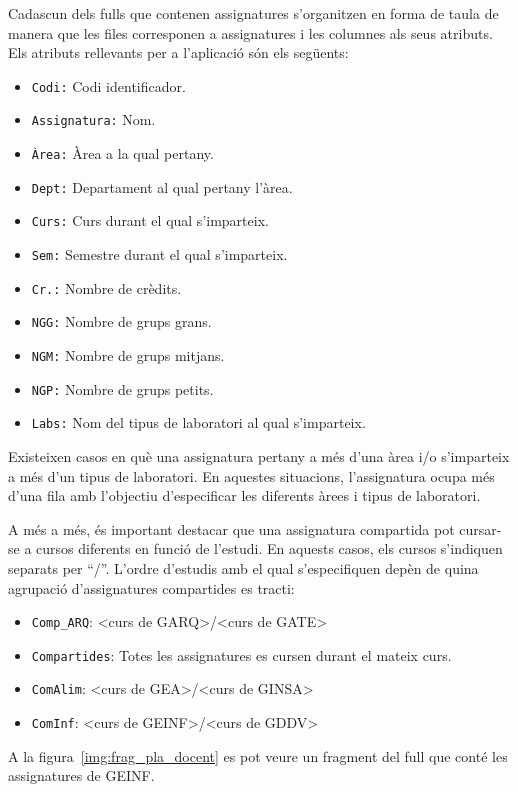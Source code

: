 \documentclass[a4paper,12pt]{ThesisStyle}
\begin{document}
Cadascun dels fulls que contenen assignatures s'organitzen en forma de taula de manera que les files corresponen a assignatures i les columnes als seus atributs. Els atributs rellevants per a l'aplicació són els següents:
\begin{itemize}
  \item \texttt{Codi:} Codi identificador.
  \item \texttt{Assignatura:} Nom.
  \item \texttt{Àrea:} Àrea a la qual pertany.
  \item \texttt{Dept:} Departament al qual pertany l'àrea.
  \item \texttt{Curs:} Curs durant el qual s'imparteix.
  \item \texttt{Sem:} Semestre durant el qual s'imparteix.
  \item \texttt{Cr.:} Nombre de crèdits.
  \item \texttt{NGG:} Nombre de grups grans.
  \item \texttt{NGM:} Nombre de grups mitjans.
  \item \texttt{NGP:} Nombre de grups petits.
  \item \texttt{Labs:} Nom del tipus de laboratori al qual s'imparteix.
\end{itemize}

Existeixen casos en què una assignatura pertany a més d'una àrea i/o s'imparteix a més d'un tipus de laboratori. En aquestes situacions, l'assignatura ocupa més d'una fila amb l'objectiu d'especificar les diferents àrees i tipus de laboratori.

A més a més, és important destacar que una assignatura compartida pot cursar-se a cursos diferents en funció de l'estudi. En aquests casos, els cursos s'indiquen separats per ``/''. L'ordre d'estudis amb el qual s'especifiquen depèn de quina agrupació d'assignatures compartides es tracti:
\begin{itemize}
  \item \texttt{Comp\_ARQ}: <curs de GARQ>/<curs de GATE>
  \item \texttt{Compartides}: Totes les assignatures es cursen durant el mateix curs.
  \item \texttt{ComAlim}: <curs de GEA>/<curs de GINSA>
  \item \texttt{ComInf}: <curs de GEINF>/<curs de GDDV>
\end{itemize}

A la figura~\ref{img:frag_pla_docent} es pot veure un fragment del full que conté les assignatures de GEINF.
\end{document}
